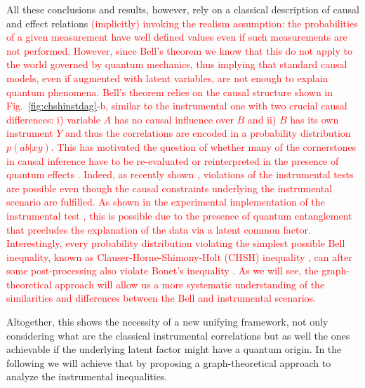\documentclass[letterpaper]{article}
\begin{document}
All these conclusions and results, however, rely on a classical
description of causal and effect relations \textcolor{red}{(implicitly)
invoking the realism assumption: the probabilities of a given
measurement have well defined values even if such measurements are not
performed. However, since Bell's theorem \cite{bell1964} we know that
this do not apply to the world governed by quantum mechanics, thus
implying that standard causal models, even if augmented with latent
variables, are not enough to explain quantum phenomena. Bell's theorem
relies on the causal structure shown in Fig.~\ref{fig:chshinstdag}-b,
similar to the instrumental one with two crucial causal differences:
i) variable $A$ has no causal influence over $B$ and ii) $B$ has
its own instrument $Y$ and thus the correlations are encoded in a
probability distribution $p(ab \vert xy)$. This has motivated the
question of whether many of the cornerstones in causal inference
have to be re-evaluated or reinterpreted in the presence of quantum
effects \cite{ried2015,Costa2016,Wolfe2016,carvachoepl}. Indeed, as recently
shown \cite{chaves2018}, violations of the instrumental tests are
possible even though the causal constraints underlying the instrumental
scenario are fulfilled. As shown in the experimental implementation
of the instrumental test \cite{chaves2018}, this is possible due to
the presence of quantum entanglement that precludes the explanation of
the data via a latent common factor. Interestingly, every probability
distribution violating the simplest possible Bell inequality, known as
Clauser-Horne-Shimony-Holt (CHSH) inequality \cite{CHSH}, can after some
post-processing also violate Bonet's inequality \cite{himbeeck2018}. As we
will see, the graph-theoretical approach will allow us a more systematic
understanding of the similarities and differences between the Bell and
instrumental scenarios.}

Altogether, this shows the necessity of a new unifying framework, not
only considering what are the classical instrumental correlations but
as well the ones achievable if the underlying latent factor might have
a quantum origin. In the following we will achieve that by proposing a
graph-theoretical approach to analyze the instrumental inequalities.
\end{document}

